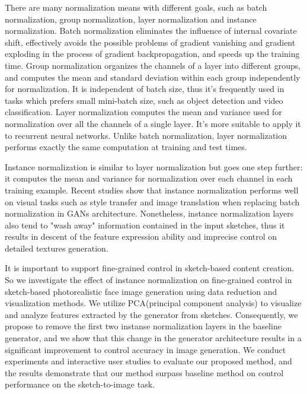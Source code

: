 \documentclass[10pt,twocolumn,letterpaper]{article}
\begin{document}
There are many normalization means with different goals, such as batch normalization\cite{bn}, group normalization\cite{gn}, layer normalization\cite{ln} and instance normalization\cite{instance_norm}. 
Batch normalization eliminates the influence of internal covariate shift, effectively avoids the possible problems of gradient vanishing and gradient exploding in the process of gradient backpropagation, and speeds up the training time. 
Group normalization organizes the channels of a layer into different groups, and computes the mean and standard deviation within each group independently for normalization. It is independent of batch size, thus it's frequently used in tasks which prefers small mini-batch size, such as object detection and video classification.
Layer normalization computes the mean and variance used for normalization over all the channels of a single layer. It's more suitable to apply it to recurrent neural networks. Unlike batch normalization, layer normalization performs exactly the same computation at training and test times.

Instance normalization is similar to layer normalization but goes one step further: it computes the mean and variance for normalization over each channel in each training example.
Recent studies show that instance normalization performs well on visual tasks such as style transfer and image translation\cite{pix2pixhd,spade,cyclegan} when replacing batch normalization in GANs architecture. 
Nonetheless, instance normalization layers also tend to "wash away" information contained in the input sketches, thus it results in descent of the feature expression ability and imprecise control on detailed textures generation. 

It is important to support fine-grained control in sketch-based content creation. 
So we investigate the effect of instance normalization on fine-grained control in sketch-based photorealistic face image generation using data reduction and visualization methods. 
We utilize PCA(principal component analysis)\cite{pca} to visualize and analyze features extracted by the generator from sketches. Consequently, we propose to remove the first two instanse normalization layers in the baseline generator, and we show that this change in the generator architecture results in a significant improvement to control accuracy in image generation. 
We conduct experiments and interactive user studies to evaluate our proposed method, and the results demonstrate that our method surpass baseline method on control performance on the sketch-to-image task.
\end{document}
